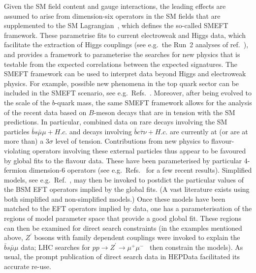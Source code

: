 \documentclass[a4paper,aps,prd,longbibliography,notitlepage,showpacs,amsmath,amssymb,superscriptaddress,nofootinbib,floatfix,11pt,preprintnumbers]{revtex4-1-mod}
\newcommand{\hepdata}{\textsf{HEPData}\xspace}
\newcommand{\eg}{e.g.\xspace}
\begin{document}
Given the SM field content and gauge interactions, the leading effects are
assumed to arise from dimension-six operators in the SM fields that are
supplemented to the SM Lagrangian~\cite{Giudice:2007fh,Grzadkowski:2010es,%
Contino:2013kra}, which defines the so-called SMEFT framework.
These parametrise fits to current electroweak and Higgs data, which facilitate the extraction of Higgs couplings (see \eg~the Run~2 analyses of ref.~\cite{%
Almeida:2018cld,Biekotter:2018rhp,Ellis:2018gqa,Kraml:2019sis,Hartland:2019bjb,%
Brivio:2019ius}), and
provides a framework to parameterise the searches for new physics that is
testable from the expected correlations between the expected signatures.
%
The SMEFT framework can be used to interpret data beyond Higgs and electroweak physics. For example, possible new phenomena in the top quark sector can be included in the SMEFT scenario, see \eg~Refs.~\cite{Hartland:2019bjb,Maltoni:2019aot}. Moreover,
after being evolved to the scale of the $b$-quark mass, the same SMEFT
framework allows for the analysis of the recent data based on $B$-meson decays that are in tension with the SM predictions. In particular, combined data on rare decays involving the SM particles $\bar b s \bar \mu \mu+H.c.$ and decays involving $\bar b c \bar \tau \nu+H.c.$ are currently at (or are at more than) a 3$\sigma$ level of tension. Contributions from new physics to flavour-violating operators involving these external particles thus appear to be favoured by global fits to the flavour data.  These have been parameterised by particular 4-fermion dimension-6 operators (see \eg~Refs.~\cite{Alguero:2019ptt,Alok:2019ufo,Ciuchini:2019usw,Datta:2019zca,Arbey:2019duh} for a few recent results).
Simplified models, see \eg~Ref.~\cite{Buttazzo:2017ixm}, may then be invoked to postdict the particular values of the BSM EFT operators implied by the global fits. (A vast literature exists using both simplified and non-simplified models.)
Once these models have been matched to the EFT operators implied by data, one has a parameterisation of the regions of  model parameter space that provide a good global fit. These regions can then be examined for direct search constraints (in the examples mentioned above, $Z^\prime$ bosons with family dependent couplings were invoked to explain the $\bar b s \bar \mu \mu$ data; LHC searches for $pp \rightarrow Z^\prime \rightarrow \mu^+ \mu^-$~\cite{Aad:2019fac} then constrain the models). As usual, the prompt publication of direct search data in \hepdata facilitated its accurate re-use.


\end{document}
